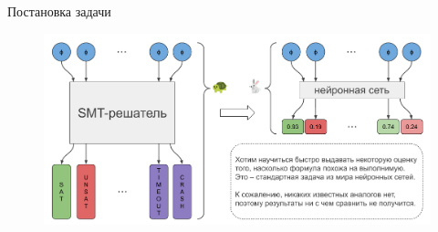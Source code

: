 \documentclass[14pt,aspectratio=169,hyperref={pdftex,unicode},xcolor=dvipsnames]{beamer}
\begin{document}
\begin{frame}{Постановка задачи}

\begin{figure}[ht]
\begin{center}
  \includegraphics[scale=0.4]{./assets/problem-statement.pdf}
\end{center}
\end{figure}

\end{frame}
\end{document}

